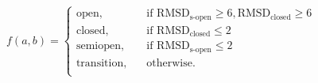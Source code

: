 

\[   
f(a,b) = 
     \begin{cases}
       \text{open,} &\quad\text{if RMSD}_\text{s-open}\ge6, \text{RMSD}_\text{closed}\ge6\\
       \text{closed,} &\quad\text{if RMSD}_\text{closed}\le2 \\
       \text{semiopen,} &\quad\text{if RMSD}_\text{s-open}\le2\\
       \text{transition,} &\quad\text{otherwise.} \\ 
     \end{cases}
\]
